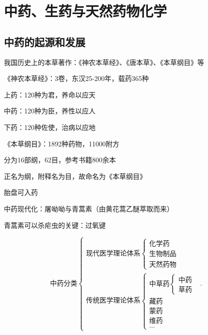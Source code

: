 \section{中药、生药与天然药物化学}%
\label{sec:中药、生药与天然药物化学}
\subsection{中药的起源和发展}%
\label{sub:中药的起源和发展}
    我国历史上的本草著作：《神农本草经》、《唐本草》、《本草纲目》等
\begin{notation}
    《神农本草经》：3卷，东汉25-200年，载药365种

    上药：120种为君，养命以应天

    中药：120种为臣，养性以应人

    下药：120种佐使，治病以应地
\end{notation}
\begin{notation}
    《本草纲目》：1892种药物，11000附方

    分为16部纲，62目，参考书籍800余本

    正名为纲，附释名为目，故命名为《本草纲目》
\end{notation}
\begin{eg}
    胎盘可入药
\end{eg}
中药现代化：屠呦呦与青蒿素（由黄花蒿乙醚萃取而来）
\begin{notation}
    青蒿素可以杀疟虫的关键：过氧键
\end{notation}
\[
    \mbox{中药分类}
    \begin{cases}
        \mbox{现代医学理论体系}
        \begin{cases}
            \mbox{化学药}\\ 
            \mbox{生物制品}\\ 
            \mbox{天然药物}
        \end{cases}\\
        \mbox{传统医学理论体系}
        \begin{cases}
            \mbox{中草药}
            \begin{cases}
                \mbox{中药}\\ 
                \mbox{草药}
            \end{cases}\\
            \mbox{藏药}\\ 
            \mbox{蒙药}\\ 
            \mbox{维药}\\
            \ldots
        \end{cases}
    \end{cases}
.\] 
